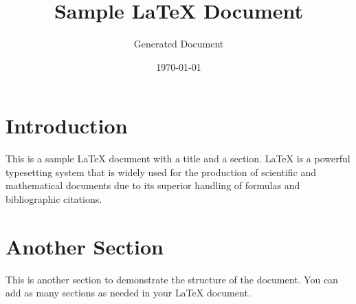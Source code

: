 \documentclass{article}
\title{Sample LaTeX Document}
\author{Generated Document}
\date{\today}
\begin{document}
\maketitle

\section{Introduction}
This is a sample LaTeX document with a title and a section. LaTeX is a powerful typesetting system that is widely used for the production of scientific and mathematical documents due to its superior handling of formulas and bibliographic citations.

\section{Another Section}
This is another section to demonstrate the structure of the document. You can add as many sections as needed in your LaTeX document.
\end{document}
